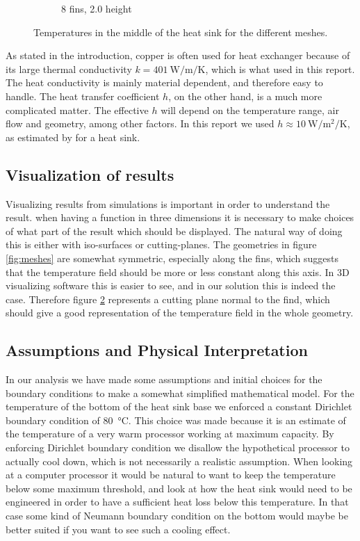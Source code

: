 \begin{figure}[h]
\begin{subfigure}[t] {0.23\textwidth}
\caption{8 fins, \num{2.0} height}
\label{fig:mesh_temps_res_8_2}
\end{subfigure}
\caption{Temperatures in the middle of the heat sink for the different meshes.}
\label{fig:mesh_temps}
\end{figure}

As stated in the introduction, copper is often used for heat exchanger because of its large thermal conductivity $k = \SI{401}{\watt\per\meter\per\kelvin}$, which is what used in this report. The heat conductivity is mainly material dependent, and therefore easy to handle. The heat transfer coefficient $h$, on the other hand, is a much more complicated matter. The effective $h$ will depend on the temperature range, air flow and geometry, among other factors. In this report we used $h \approx \SI{10}{\watt\per\meter\squared\per\kelvin}$, as estimated by \cite{heat_transfer_coeff} for a heat sink.

\subsection{Visualization of results}
Visualizing results from simulations is important in order to understand the result. when having a function in three dimensions it is necessary to make choices of what part of the result which should be displayed. The natural way of doing this is either with iso-surfaces or cutting-planes. The geometries in figure \ref{fig:meshes} are somewhat symmetric, especially along the fins, which suggests that the temperature field should be more or less constant along this axis. In 3D visualizing software this is easier to see, and in our solution this is indeed the case. Therefore figure \ref{fig:mesh_temps} represents a cutting plane normal to the find, which should give a good representation of the temperature field in the whole geometry.

\subsection{Assumptions and Physical Interpretation}
In our analysis we have made some assumptions and initial choices for the boundary conditions to make a somewhat simplified mathematical model. For the temperature of the bottom of the heat sink base we enforced a constant Dirichlet boundary condition of \SI{80}{\celsius}. This choice was made because it is an estimate of the temperature of a very warm processor working at maximum capacity. By enforcing Dirichlet boundary condition we disallow the hypothetical processor to actually cool down, which is not necessarily a realistic assumption. When looking at a computer processor it would be natural to want to keep the temperature below some maximum threshold, and look at how the heat sink would need to be engineered in order to have a sufficient heat loss below this temperature. In that case some kind of Neumann boundary condition on the bottom would  maybe be better suited if you want to see such a cooling effect.

